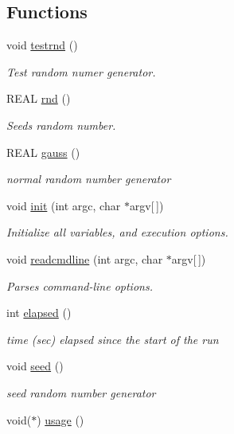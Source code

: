 \subsection*{Functions}
\begin{CompactItemize}
\item 
void \hyperlink{namespaceRun_a186b3a7a41e8fe7a5fa65e70577ebfd}{testrnd} ()
\begin{CompactList}\small\item\em Test random numer generator. \item\end{CompactList}\item 
REAL \hyperlink{namespaceRun_61c4192fdab078a931b0b143c2489a66}{rnd} ()
\begin{CompactList}\small\item\em Seeds random number. \item\end{CompactList}\item 
REAL \hyperlink{namespaceRun_d4c4416d555619b82bbaad195bbb1dcc}{gauss} ()
\begin{CompactList}\small\item\em normal random number generator \item\end{CompactList}\item 
void \hyperlink{namespaceRun_719eff34d155bf728b3c621f7c6b1c92}{init} (int argc, char $\ast$argv\mbox{[}$\,$\mbox{]})
\begin{CompactList}\small\item\em Initialize all variables, and execution options. \item\end{CompactList}\item 
void \hyperlink{namespaceRun_bce2c6229363ea0c1a164b61fcd06f89}{readcmdline} (int argc, char $\ast$argv\mbox{[}$\,$\mbox{]})
\begin{CompactList}\small\item\em Parses command-line options. \item\end{CompactList}\item 
int \hyperlink{namespaceRun_4062bda6143a9042da86a5f48ad6daf5}{elapsed} ()
\begin{CompactList}\small\item\em time (sec) elapsed since the start of the run \item\end{CompactList}\item 
void \hyperlink{namespaceRun_cc78ebcab78e6893272ed9d3c2a550f1}{seed} ()
\begin{CompactList}\small\item\em seed random number generator \item\end{CompactList}\item 
void($\ast$) \hyperlink{namespaceRun_ec4aa644c976688fe218a95f27c8430e}{usage} ()
\end{CompactItemize}
